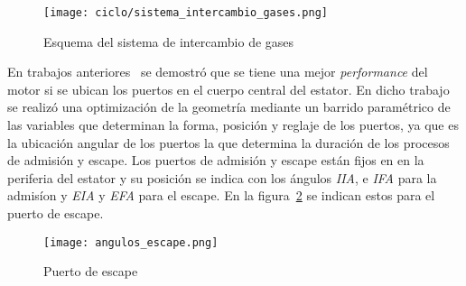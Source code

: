 \begin{figure}
    \centering
    \texttt{[image: ciclo/sistema\_intercambio\_gases.png]}
    \caption{Esquema del sistema de intercambio de gases}\label{fig:sistema_intercambio_gases}
\end{figure}


En trabajos anteriores~\parencite{lopez13} se demostró que se tiene una mejor
\emph{performance} del motor si se ubican los puertos en el cuerpo central del
estator.
%
En dicho trabajo se realizó una optimización de la geometría mediante un barrido
paramétrico de las variables que determinan la forma, posición y reglaje de los
puertos, ya que es la ubicación angular de los puertos la que determina la
duración de los procesos de admisión y escape.
%
%
Los puertos de admisión y escape están fijos en en la periferia del estator y su
posición se indica con los ángulos \emph{IIA}, e \emph{IFA} para la admisíon y
\emph{EIA} y \emph{EFA} para el escape.
%
En la figura~\ref{fig:angulos_escape} se indican estos para el puerto de escape.

\begin{figure}
    \centering
    \texttt{[image: angulos\_escape.png]}
    \caption{Puerto de escape}\label{fig:angulos_escape}
\end{figure}
